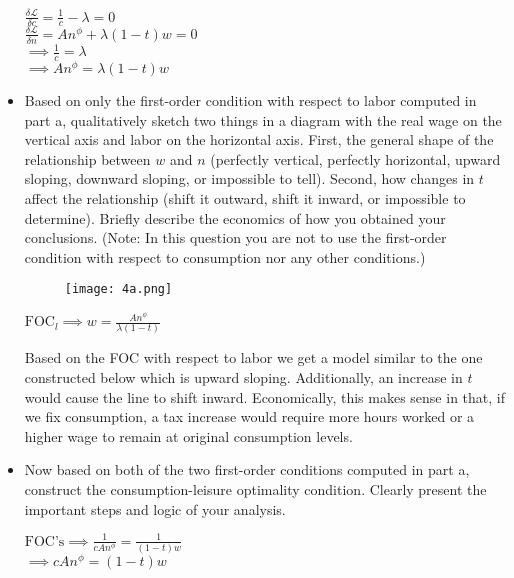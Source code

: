 \documentclass[11pt]{SelfArxOneColBMN}
\begin{document}
\begin{exercise}
\begin{itemize}
\begin{solution}
\begin{center}
				$\frac{\delta \mathcal{L}}{\delta c} = \frac{1}{c} - \lambda = 0$\\
				$\frac{\delta \mathcal{L}}{\delta n} = An^\phi + \lambda(1 - t)w = 0 $\\
				$\implies \frac{1}{c} = \lambda$\\
				$\implies An^\phi = \lambda(1 - t)w$\\
			\end{center}
		\end{solution}
		\item Based on only the first-order condition with respect to labor computed in part a, qualitatively sketch two things in a diagram with the real wage on the vertical axis and labor on the horizontal axis. First, the general shape of the relationship between $w$ and $n$ (perfectly vertical, perfectly horizontal, upward sloping, downward sloping, or impossible to tell). Second, how changes in $t$ affect the relationship (shift it outward, shift it inward, or impossible to determine). Briefly describe the economics of how you obtained your conclusions. (Note: In this question you are not to use the first-order condition with respect to consumption nor any other conditions.)
		\begin{figure}
			\texttt{[image: 4a.png]}
		\end{figure}
		\begin{solution}
			\begin{center}
				$\text{FOC}_l \implies w = \frac{An^\phi}{\lambda(1 - t)}$
			\end{center}
		Based on the FOC with respect to labor we get a model similar to the one constructed below which is upward sloping. Additionally, an increase in $t$ would cause the line to shift inward. Economically, this makes sense in that, if we fix consumption, a tax increase would require more hours worked or a higher wage to remain at original consumption levels.\\
		\end{solution}
		\item Now based on both of the two first-order conditions computed in part a, construct the consumption-leisure optimality condition. Clearly present the important steps and logic of your analysis.
		\begin{solution}
			\begin{center}
				$\text{FOC's} \implies \frac{1}{cAn^\phi} = \frac{1}{(1 - t)w}$\\
				$\implies cAn^\phi = (1 - t)w$\\

\end{center}
\end{solution}
\end{itemize}
\end{exercise}
\end{document}
